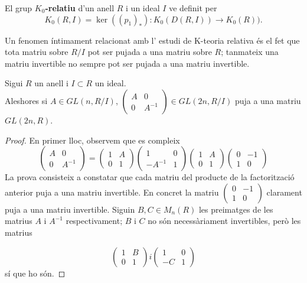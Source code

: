 \begin{definition} \label{K0relatiu}
El grup \textbf{$K_0$-relatiu} d'un anell $R$ i un ideal $I$ ve definit per 
$$
K_0(R,I) = \ker ((p_1)_*): K_0(D(R,I)) \rightarrow K_0(R)).
$$
\end{definition}

Un fenomen íntimament relacionat amb l' estudi de K-teoria relativa és el fet que tota matriu sobre $R/I$ pot ser pujada a una matriu sobre $R$; tanmateix una matriu invertible no sempre pot ser pujada a una matriu invertible. 
 
\begin{lema} \label{InvAsc} \label{matrixlifting}
Sigui $R$ un anell i $I\subset R$ un ideal.\\Aleshores si $A\in GL(n,R/I)$,    $\left( \begin{matrix}
  A & 0 \\
  0 & A^{-1}
 \end{matrix} \right) \in GL(2n,R/I)$ puja a una matriu $GL(2n,R)$.
\end{lema}


\begin{proof}
En primer lloc, observem que es compleix
\begin{equation}
\left( \begin{matrix}
  A & 0 \\
  0 & A^{-1}
 \end{matrix} \right)
 =
 \left( \begin{matrix}
  1 & A \\
  0 & 1
 \end{matrix} \right)
 \left( \begin{matrix}
  1 & 0 \\
  -A^{-1} & 1
 \end{matrix} \right)
\left( \begin{matrix}
  1 & A \\
  0 & 1
 \end{matrix} \right)
\left( \begin{matrix}
  0 & -1 \\
  1 & 0
 \end{matrix} \right) 
\end{equation}
La prova consisteix a constatar que cada matriu del producte de la factorització anterior puja a una matriu invertible. En concret la matriu $\left( \begin{matrix}
  0 & -1 \\
  1 & 0
 \end{matrix} \right) $ clarament puja a una matriu invertible. Siguin $B,C\in M_n(R)$ les preimatges de les matrius $A$ i $A^{-1}$ respectivament; $B$ i $C$ no són necessàriament invertibles, però les matrius 

 $$\left( \begin{matrix}
  1 & B \\
  0 & 1
 \end{matrix} \right) 
  i 
\left( \begin{matrix}
  1 & 0 \\
  -C & 1
 \end{matrix} \right) 
 $$
 sí que ho són.

\end{proof}

